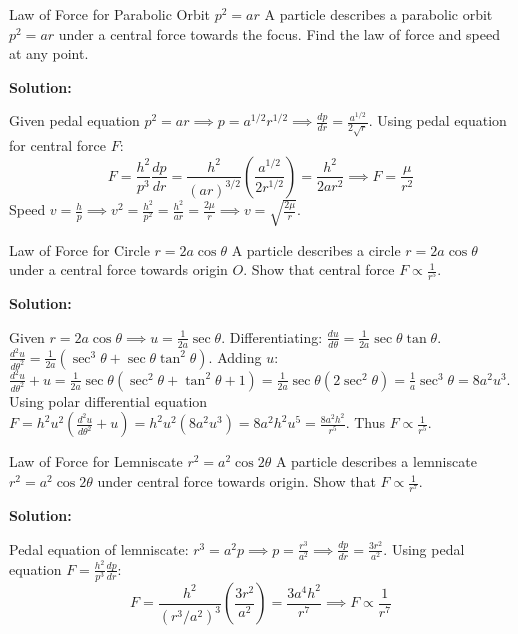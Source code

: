 \begin{examplebox}{Law of Force for Parabolic Orbit $p^2 = a r$}
A particle describes a parabolic orbit $p^2 = a r$ under a central force towards the focus. Find the law of force and speed at any point.

\tcblower
\textbf{Solution:}

Given pedal equation $p^2 = a r \implies p = a^{1/2} r^{1/2} \implies \frac{dp}{dr} = \frac{a^{1/2}}{2 \sqrt{r}}$.
Using pedal equation for central force $F$:
\begin{equation*}
    F = \frac{h^2}{p^3} \frac{dp}{dr} = \frac{h^2}{(a r)^{3/2}} \left( \frac{a^{1/2}}{2 r^{1/2}} \right) = \frac{h^2}{2 a r^2} \implies F = \frac{\mu}{r^2}
\end{equation*}
Speed $v = \frac{h}{p} \implies v^2 = \frac{h^2}{p^2} = \frac{h^2}{a r} = \frac{2\mu}{r} \implies v = \sqrt{\frac{2\mu}{r}}$.
\end{examplebox}

\begin{examplebox}{Law of Force for Circle $r = 2a \cos\theta$}
A particle describes a circle $r = 2a \cos\theta$ under a central force towards origin $O$. Show that central force $F \propto \frac{1}{r^5}$.

\tcblower
\textbf{Solution:}

Given $r = 2a \cos\theta \implies u = \frac{1}{2a} \sec\theta$.
Differentiating: $\frac{du}{d\theta} = \frac{1}{2a} \sec\theta \tan\theta$.
$\frac{d^2u}{d\theta^2} = \frac{1}{2a} (\sec^3\theta + \sec\theta \tan^2\theta)$.
Adding $u$: $\frac{d^2u}{d\theta^2} + u = \frac{1}{2a} \sec\theta (\sec^2\theta + \tan^2\theta + 1) = \frac{1}{2a} \sec\theta (2\sec^2\theta) = \frac{1}{a} \sec^3\theta = 8 a^2 u^3$.
Using polar differential equation $F = h^2 u^2 \left( \frac{d^2u}{d\theta^2} + u \right) = h^2 u^2 (8 a^2 u^3) = 8 a^2 h^2 u^5 = \frac{8 a^2 h^2}{r^5}$.
Thus $F \propto \frac{1}{r^5}$.
\end{examplebox}

\begin{examplebox}{Law of Force for Lemniscate $r^2 = a^2 \cos 2\theta$}
A particle describes a lemniscate $r^2 = a^2 \cos 2\theta$ under central force towards origin. Show that $F \propto \frac{1}{r^7}$.

\tcblower
\textbf{Solution:}

Pedal equation of lemniscate: $r^3 = a^2 p \implies p = \frac{r^3}{a^2} \implies \frac{dp}{dr} = \frac{3 r^2}{a^2}$.
Using pedal equation $F = \frac{h^2}{p^3} \frac{dp}{dr}$:
\begin{equation*}
    F = \frac{h^2}{(r^3/a^2)^3} \left( \frac{3 r^2}{a^2} \right) = \frac{3 a^4 h^2}{r^7} \implies F \propto \frac{1}{r^7}
\end{equation*}
\end{examplebox}
